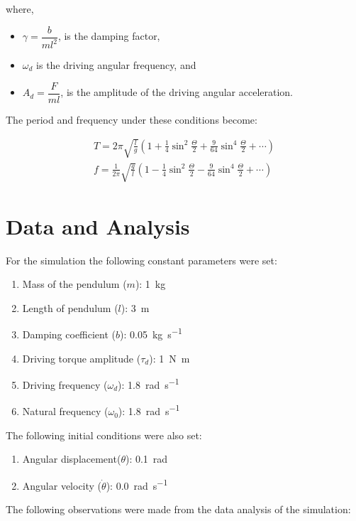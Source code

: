 \documentclass[12pt]{article}
\begin{document}
where,
\begin{itemize}
    \item $\gamma  = \dfrac{b}{ml^2}$, is the damping factor,
    \item $\omega_d$ is the driving angular frequency, and
    \item $A_d = \dfrac{F} {ml}$, is the amplitude of the driving angular acceleration.
\end{itemize}

The period and frequency under these conditions become:

\begin{eqnarray}
    T = 2\pi \sqrt{\frac{l}{g}} \left(1 + \frac{1}{4}\sin^2{\frac{\Theta}{2}} + \frac{9}{64}\sin^4{\frac{\Theta}{2}} + \cdots \right) \\
    f = \frac{1}{2\pi} \sqrt{\frac{g}{l}} \left(1 - \frac{1}{4}\sin^2{\frac{\Theta}{2}} - \frac{9}{64}\sin^4{\frac{\Theta}{2}} + \cdots \right)
\end{eqnarray}

\section{Data and Analysis}
For the simulation the following constant parameters were set:

\begin{enumerate}
    \item Mass of the pendulum ($m$): \SI{1}{\kilogram}
    \item Length of pendulum ($l$): \SI{3}{\meter}
    \item Damping coefficient ($b$): \SI{0.05}{\kilogram\per\second}
    \item Driving torque amplitude ($\tau_d$): \SI{1}{\newton\meter}
    \item Driving frequency ($\omega_d$): \SI{1.8}{\radian\per\second}
    \item Natural frequency ($\omega_0$): \SI{1.8}{\radian\per\second}
\end{enumerate}

The following initial conditions were also set:

\begin{enumerate}
    \item Angular displacement($\theta$): \SI{0.1}{\radian}
    \item Angular velocity ($\dot{\theta}$): \SI{0.0}{\radian\per\second}
\end{enumerate}

The following observations were made from the data analysis of the simulation:
\end{document}
